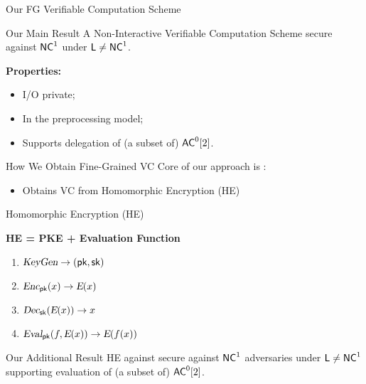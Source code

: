 \begin{frame}{Our FG Verifiable Computation Scheme}

\begin{block}{Our Main Result}
	A Non-Interactive Verifiable Computation Scheme secure against ${\mathsf{NC}}^1$ under ${\mathsf{L}} \not = {\mathsf{NC}}^1$.
\end{block}
\pause
\textbf{Properties:}
\begin{itemize}[<+- | alert@+>]
	\item I/O private;
	\item In the preprocessing model;
	\item Supports delegation of (a subset of) ${\mathsf{AC}}^0[2]$.
\end{itemize}
\end{frame}


\begin{frame}{How We Obtain Fine-Grained VC}
	Core of our approach is \cite{ckv10}:
	\begin{itemize}
		\item  Obtains VC from Homomorphic Encryption (HE)
	\end{itemize}
\end{frame}

\def\E{\func{E}}

\begin{frame}{Homomorphic Encryption (HE)}
	\begin{center} \textbf{HE = PKE + Evaluation Function} \end{center}
	\begin{enumerate}
		\item ${\textsl{KeyGen}} \to (\mathsf{pk}, \mathsf{sk})$
		\item $\func{Enc}_{\pk}(x) \to \E(x)$
		\item $\func{Dec}_{\sk}(\E(x)) \to x$
		\pause  
		\item $\func{Eval}_{\pk}(f, \E(x)) \to \E(f(x))$
	\end{enumerate}
	\pause
	\bigskip
	\begin{block}{Our Additional Result}
		HE against secure against ${\mathsf{NC}}^1$ adversaries under ${\mathsf{L}} \not = {\mathsf{NC}}^1$ supporting evaluation of (a subset of) ${\mathsf{AC}}^0[2]$.
	\end{block}
\end{frame}

